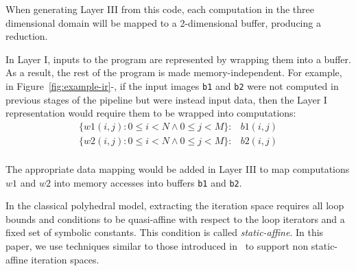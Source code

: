When generating Layer III from this code, each computation in the three dimensional domain will be mapped to a 2-dimensional
buffer, producing a reduction.


In Layer I, inputs to the program are represented by wrapping them into a buffer.  As a result,  the rest of the program is made memory-independent. For example, in Figure~\ref{fig:example-ir}-\codeone{}, if the input images \lstinline{b1} and \lstinline{b2} were not computed in previous stages of the pipeline but were instead input data, then the Layer I representation would require them to be wrapped into computations:
\begin{align*}
\{w1(i,j):  0\leq i < N \wedge 0\leq j < M \}: &  b1(i,j) \\
\{w2(i,j):  0\leq i < N \wedge 0\leq j < M \}: & b2(i,j) \\
\end{align*}

The appropriate data mapping would be added in Layer III to map computations $w1$ and $w2$ into 
memory accesses into buffers \lstinline{b1} and \lstinline{b2}.




In the classical polyhedral model, extracting the iteration space requires all loop bounds and conditions to be quasi-affine with respect to the loop iterators and a fixed set of symbolic constants. This condition is called \emph{static-affine}.  In this paper, we use techniques similar to those introduced in~\cite{benabderrahmane_polyhedral_2010,pencil} to support non static-affine iteration spaces.

